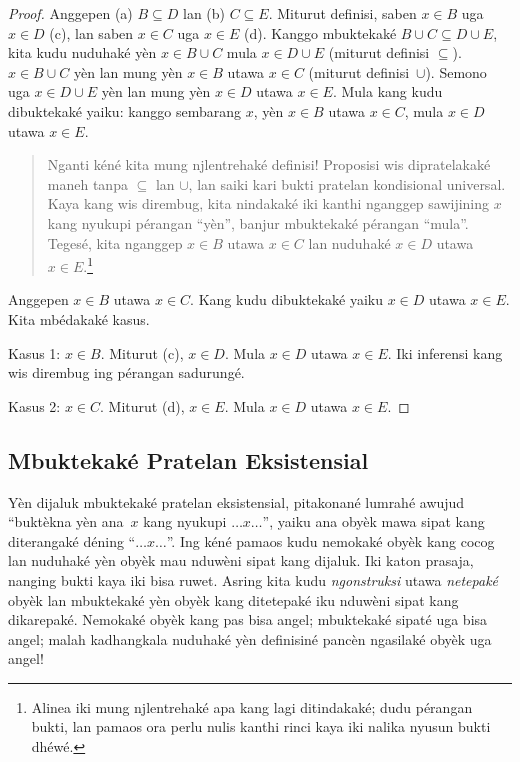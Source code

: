 \documentclass[../../../include/open-logic-section]{subfiles}
\begin{document}
\begin{proof}
  Anggepen (a) $B \subseteq D$ lan (b) $C \subseteq E$.
  Miturut definisi, saben $x \in B$ uga $x \in D$ (c),
  lan saben $x \in C$ uga $x \in E$ (d).
  Kanggo mbuktekaké $B \cup C \subseteq D \cup E$, kita
  kudu nuduhaké yèn $x \in B \cup C$ mula $x \in D \cup E$
  (miturut definisi $\subseteq$). $x \in B \cup C$ yèn
  lan mung yèn $x \in B$ utawa $x \in C$ (miturut definisi~$\cup$).
  Semono uga $x \in D \cup E$ yèn lan mung yèn $x \in D$
  utawa $x \in E$. Mula kang kudu dibuktekaké yaiku:
  kanggo sembarang $x$, yèn $x \in B$ utawa $x \in C$,
  mula $x \in D$ utawa $x \in E$.

  \begin{quote}
  Nganti kéné kita mung njlentrehaké definisi!{} Proposisi wis
  dipratelakaké maneh tanpa $\subseteq$ lan $\cup$, lan saiki
  kari bukti pratelan kondisional universal. Kaya kang wis dirembug,
  kita nindakaké iki kanthi nganggep sawijining $x$ kang nyukupi
  pérangan ``yèn'', banjur mbuktekaké pérangan ``mula''.
  Tegesé, kita nganggep $x \in B$ utawa $x \in C$ lan
  nuduhaké $x \in D$ utawa $x \in E$.\footnote{Alinea iki mung
  njlentrehaké apa kang lagi ditindakaké; dudu pérangan bukti,
  lan pamaos ora perlu nulis kanthi rinci kaya iki nalika
  nyusun bukti dhéwé.}
  \end{quote}

  Anggepen $x \in B$ utawa $x \in C$. Kang kudu dibuktekaké
  yaiku $x \in D$ utawa $x \in E$. Kita mbédakaké kasus.

  Kasus 1: $x \in B$. Miturut (c), $x \in D$. Mula $x \in D$
  utawa $x \in E$. Iki inferensi kang wis dirembug ing
  pérangan sadurungé.

  Kasus 2: $x \in C$. Miturut (d), $x \in E$. Mula $x \in D$
  utawa $x \in E$.
\end{proof}

\subsection{Mbuktekaké Pratelan Eksistensial}

Yèn dijaluk mbuktekaké pratelan eksistensial, pitakonané lumrahé
awujud ``buktèkna yèn ana~$x$ kang nyukupi $\dots x \dots$'',
yaiku ana obyèk mawa sipat kang diterangaké déning ``$\dots x
\dots$''. Ing kéné pamaos kudu nemokaké obyèk kang cocog
lan nuduhaké yèn obyèk mau nduwèni sipat kang dijaluk.
Iki katon prasaja, nanging bukti kaya iki bisa ruwet. Asring
kita kudu \emph{ngonstruksi} utawa \emph{netepaké} obyèk
lan mbuktekaké yèn obyèk kang ditetepaké iku nduwèni
sipat kang dikarepaké. Nemokaké obyèk kang pas bisa angel;
mbuktekaké sipaté uga bisa angel; malah kadhangkala nuduhaké
yèn definisiné pancèn ngasilaké obyèk uga angel!{}
\end{document}
